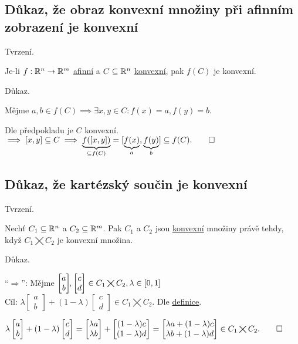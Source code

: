 \subsection{Důkaz, že obraz konvexní množiny při afinním zobrazení je konvexní}
Tvrzení.

Je-li $f: \mathbb{R}^n \rightarrow \mathbb{R}^m$ \hyperref[sec:afin]{afinní} a $C \subseteq \mathbb{R}^n$ \hyperref[sec:konvex]{konvexní}, pak
$f(C)$ je konvexní.

Důkaz.

Mějme $a, b \in f(C) \implies \exists x, y \in C: f(x)=a, f(y)=b$.

Dle předpokladu je $C$ konvexní. $\implies [x, y] \subseteq C \implies \underbrace{f([x, y])}_{\subseteq f(C)} =
[\underbrace{f(x)}_a, \underbrace{f(y)}_b] \subseteq f(C). \qed$

\subsection{Důkaz, že kartézský součin je konvexní}
Tvrzení.

Nechť $C_1 \subseteq \mathbb{R}^n$ a $C_2 \subseteq \mathbb{R}^m$. Pak $C_1$ a $C_2$ jsou \hyperref[sec:konvex]{konvexní} množiny právě 
tehdy, když $C_1 \bigtimes C_2$ je konvexní množina.

Důkaz.

\enquote{$\Rightarrow$}: Mějme
$
\begin{bmatrix}
    a \\
    b
\end{bmatrix}\hspace{-1mm}\text{,}
\begin{bmatrix}
    c \\
    d
\end{bmatrix} \in C_1 \bigtimes C_2, \lambda \in [0,1]$\\
Cíl:
$
\lambda \begin{bmatrix}
    a \\
    b
\end{bmatrix}
+ (1-\lambda)
\begin{bmatrix}
    c \\
    d
\end{bmatrix} \in C_1 \bigtimes C_2.$ Dle \hyperref[sec:konvex]{definice}.

$
\lambda \begin{bmatrix}
    a \\
    b
\end{bmatrix}
+ (1-\lambda)
\begin{bmatrix}
    c \\
    d
\end{bmatrix} =
\begin{bmatrix}
    \lambda a \\
    \lambda b
\end{bmatrix}
+
\begin{bmatrix}
    (1-\lambda)c \\
    (1-\lambda)d
\end{bmatrix}
=
\begin{bmatrix} %
    \lambda a + (1-\lambda)c \\
    \lambda b + (1-\lambda)d
\end{bmatrix} \in C_1 \bigtimes C_2. \qed$

